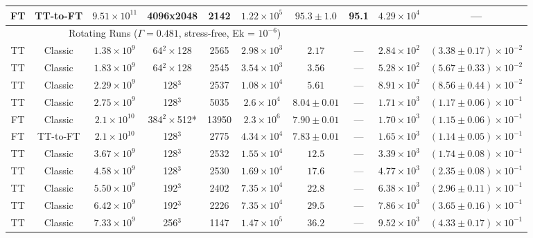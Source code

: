 \documentclass[aps, pre, onecolumn, nofootinbib, notitlepage, groupedaddress, amsfonts, amssymb, amsmath, longbibliography, superscriptaddress]{revtex4-1}
\begin{document}
\begin{table}[ht]
\begin{center}
{\begin{tabular}{c c c c c c c c c c}
FT			&	TT-to-FT	&	$9.51 \times 10^{11}$	&	4096x2048	&	2142		&	$1.22 \times 10^5$	& 	$95.3 \pm 1.0$ 	&	95.1	&	$4.29 \times 10^4$ & --- \\
\hline																	
\multicolumn{7}{c}{\vspace{0.1cm}Rotating Runs ($\Gamma = 0.481$, stress-free, Ek = $10^{-6}$)} \\
\hline																	
TT	&	Classic		&	$1.38 \times 10^9$		&	64$^2\times$128 	&	2565		&	$2.98 \times 10^3$	&	$2.17$			&	---		&	$2.84 \times 10^2$  & $(3.38 \pm 0.17) \times 10^{-2}$ \\
TT	&	Classic		&	$1.83 \times 10^9$		&	64$^2\times$128 	&	2545		&	$3.54 \times 10^3$	&	$3.56$			&	---		&	$5.28 \times 10^2$  & $(5.67 \pm 0.33) \times 10^{-2}$ \\
TT	&	Classic		&	$2.29 \times 10^9$		&	128$^3$				&	2537		&	$1.08 \times 10^4$	&	$5.61$			&	---		&	$8.91 \times 10^2$  & $(8.56 \pm 0.44) \times 10^{-2}$ \\
TT	&	Classic		&	$2.75 \times 10^9$		&	128$^3$				&	5035		&	$2.6 \times 10^4$	&	$8.04 \pm 0.01$	&	---		&	$1.71 \times 10^3$  & $(1.17 \pm 0.06) \times 10^{-1}$ \\
FT	&	Classic		&	$2.1 \times 10^{10}$	&	384$^2\times$512*	&	13950		&	$2.3 \times 10^6$	&	$7.90 \pm 0.01$	&	---		&	$1.70 \times 10^3$  & $(1.15 \pm 0.06) \times 10^{-1}$ \\
FT	&	TT-to-FT	&	$2.1 \times 10^{10}$	&	128$^3$				&	2775		&	$4.34 \times 10^4$	&	$7.83 \pm 0.01$	&	---		&	$1.65 \times 10^3$  & $(1.14 \pm 0.05) \times 10^{-1}$ \\
TT	&	Classic		&	$3.67 \times 10^9$		&	128$^3$				&	2532		&	$1.55 \times 10^4$	&	$12.5$			&	---		&	$3.39 \times 10^3$  & $(1.74 \pm 0.08) \times 10^{-1}$ \\
TT	&	Classic		&	$4.58 \times 10^9$		&	128$^3$				&	2530		&	$1.69 \times 10^4$	&	$17.6$			&	---		&	$4.77 \times 10^3$  & $(2.35 \pm 0.08) \times 10^{-1}$ \\
TT	&	Classic		&	$5.50 \times 10^9$		&	192$^3$				&	2402		&	$7.35 \times 10^4$	&	$22.8$			&	---		&	$6.38 \times 10^3$  & $(2.96 \pm 0.11) \times 10^{-1}$ \\
TT	&	Classic		&	$6.42 \times 10^9$		&	192$^3$				&	2226		&	$7.35 \times 10^4$	&	$29.5$			&	---		&	$7.86 \times 10^3$  & $(3.65 \pm 0.16) \times 10^{-1}$ \\
TT	&	Classic		&	$7.33 \times 10^9$		&	256$^3$				&	1147		&	$1.47 \times 10^5$	&	$36.2$			&	---		&	$9.52 \times 10^3$  & $(4.33 \pm 0.17) \times 10^{-1}$ \\

\end{tabular}}
\end{center}
\end{table}
\end{document}
